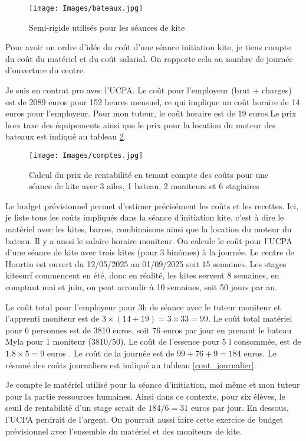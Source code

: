 \documentclass[11pt,a4paper]{report}
\begin{document}
\begin{figure}
\centering
\texttt{[image: Images/bateaux.jpg]} 
\caption{Semi-rigide utilisés pour les séances de kite\label{bateaux}}
\end{figure}
Pour avoir un ordre d'idée du coût d'une séance initiation kite, je
tiens compte du co\^ut du matériel et du co\^ut salarial. On rapporte 
cela au nombre de journée d'ouverture du centre.

Je suis en contrat pro avec l'UCPA. Le coût pour
l'employeur (brut + charges) est de 2089 euros pour 152 heures mensuel, 
ce qui implique un coût horaire de 14 euros pour l'employeur.
Pour mon tuteur, le coût horaire est de 19 euros.Le prix hors taxe
des équipements ainsi que le prix pour la location du moteur des
bateaux est indiqué au tableau \ref{couts}.

\begin{figure}
\texttt{[image: Images/comptes.jpg]} 
\caption{Calcul du prix de rentabilité en tenant compte
des co\^uts  pour une séance de kite
avec 3 ailes, 1 bateau, 2 moniteurs et 6 stagiaires\label{couts}}
\end{figure}

Le budget prévisionnel permet d'estimer précisément les co\^uts et les recettes.
Ici, je liste tous les coûts impliqués dans la séance d’initiation kite, 
c'est  à dire le matériel avec les kites, barres, combinaisons ainsi que
la location du moteur du bateau. Il y a aussi le salaire horaire moniteur. 
On calcule le coût pour l'UCPA
d'une séance de kite avec trois kites (pour 3 binômes) à la journée.
Le centre de Hourtin est ouvert du 12/05/2025 au 01/09/2025 soit 15 semaines. 
Les stages kitesurf commencent en été, donc en réalité, les kites servent
8 semaines, en comptant mai et juin, on peut arrondir à 10 semaines, soit 50 jours
par an.

Le coût total pour l'employeur pour 3h de séance avec le tuteur moniteur
et l'apprenti moniteur est de $3\times(14+19) = 3\times33 = 99 $.
Le coût total matériel pour 6 personnes est de 3810 euros, soit 76 euros
par jour  en prenant le bateau Myla pour 1 moniteur ($3810/50$).
Le coût de l'essence pour 5 l consommée, est de $1.8\times5 = 9$ euros .
Le coût de la journée est de $99 + 76 + 9 =  184 $ euros.
Le résumé des coûts journaliers est indiqué au tableau \ref{cout_journalier}.

Je compte le matériel utilisé pour la séance d’initiation,
moi m\^eme et mon tuteur pour la partie ressources humaines.
Ainsi dans ce contexte,  pour six élèves, le seuil de rentabilité
d'un stage serait de $184/6 = 31$ euros
par jour. En dessous, l'UCPA perdrait de l'argent.
On pourrait aussi faire cette exercice de budget prévisionnel avec
l'ensemble du matériel et des moniteurs de kite.
\end{document}
